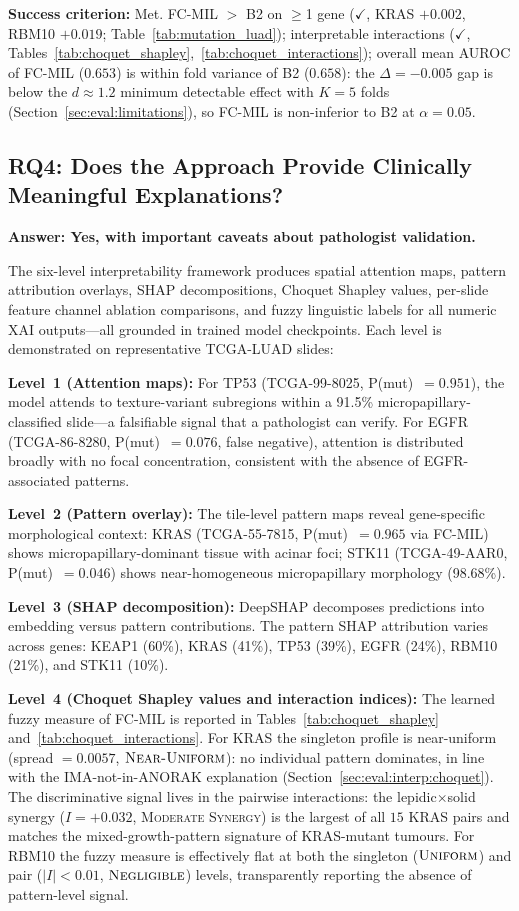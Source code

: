 \textbf{Success criterion:} Met.
FC-MIL $>$ B2 on $\geq$1 gene ($\checkmark$, KRAS $+0.002$,
RBM10 $+0.019$; Table~\ref{tab:mutation_luad});
interpretable interactions
($\checkmark$, Tables~\ref{tab:choquet_shapley},~\ref{tab:choquet_interactions});
overall mean AUROC of FC-MIL ($0.653$) is within fold variance of
B2 ($0.658$): the $\Delta = -0.005$ gap is below the
$d \approx 1.2$ minimum detectable effect with $K = 5$ folds
(Section~\ref{sec:eval:limitations}), so FC-MIL is non-inferior to
B2 at $\alpha = 0.05$.

\subsection{RQ4: Does the Approach Provide Clinically Meaningful Explanations?}
\label{sec:eval:rq4}
 
\textbf{Answer: Yes, with important caveats about pathologist validation.}

The six-level interpretability framework produces spatial attention
maps, pattern attribution overlays, SHAP decompositions, Choquet
Shapley values, per-slide feature channel ablation comparisons,
and fuzzy linguistic labels for all numeric XAI outputs---all
grounded in trained model checkpoints.
Each level is demonstrated on representative TCGA-LUAD slides:

\textbf{Level~1 (Attention maps):}
For TP53 (TCGA-99-8025, P(mut)~$= 0.951$), the model attends to
texture-variant subregions within a 91.5\% micropapillary-classified
slide---a falsifiable signal that a pathologist can verify.
For EGFR (TCGA-86-8280, P(mut)~$= 0.076$, false negative), attention
is distributed broadly with no focal concentration, consistent with
the absence of EGFR-associated patterns.

\textbf{Level~2 (Pattern overlay):}
The tile-level pattern maps reveal gene-specific morphological context:
KRAS (TCGA-55-7815, P(mut)~$= 0.965$ via FC-MIL) shows
micropapillary-dominant tissue with acinar foci;
STK11 (TCGA-49-AAR0, P(mut)~$= 0.046$) shows near-homogeneous
micropapillary morphology (98.68\%).

\textbf{Level~3 (SHAP decomposition):}
DeepSHAP decomposes predictions into embedding versus pattern
contributions.
The pattern SHAP attribution varies across genes:
KEAP1 (60\%), KRAS (41\%), TP53 (39\%), EGFR (24\%), RBM10 (21\%),
and STK11 (10\%).

\textbf{Level~4 (Choquet Shapley values and interaction indices):}
The learned fuzzy measure of FC-MIL is reported in
Tables~\ref{tab:choquet_shapley} and~\ref{tab:choquet_interactions}.
For KRAS the singleton profile is near-uniform (spread $=0.0057$,
$\textsc{Near-Uniform}$): no individual pattern dominates, in line
with the IMA-not-in-ANORAK explanation
(Section~\ref{sec:eval:interp:choquet}).
The discriminative signal lives in the pairwise interactions: the
lepidic$\times$solid synergy ($I = +0.032$, \textsc{Moderate
Synergy}) is the largest of all $15$ KRAS pairs and matches the
mixed-growth-pattern signature of KRAS-mutant tumours.
For RBM10 the fuzzy measure is effectively flat at both the
singleton ($\textsc{Uniform}$) and pair ($|I|<0.01$,
$\textsc{Negligible}$) levels, transparently reporting the absence
of pattern-level signal.

